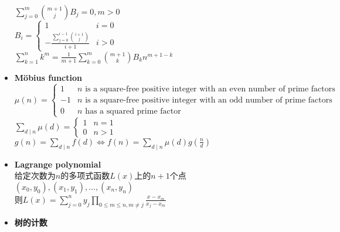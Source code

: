\begin{itemize}
			\\$ \sum\limits_{j = 0}^{m} \binom{m + 1}{j} B_j = 0, m > 0 $
			\\$ B_i = \begin{cases}
				1 & i = 0\\
				-\frac{\sum\limits_{j = 0}^{i - 1} \binom{i + 1}{j}}{i + 1} & i > 0
			\end{cases} $
			\\$ \sum\limits_{k = 1}^{n} k ^ m = \frac{1}{m + 1} \sum\limits_{k = 0}^{m} \binom{m + 1}{k} B_k n ^ {m + 1 - k} $
		\item \textbf{Möbius function}
			\\$ \mu(n) = \begin{cases}
				1 & n \text{ is a square-free positive integer with an even number of prime factors}\\
				-1 & n \text{ is a square-free positive integer with an odd number of prime factors}\\
				0 & n \text{ has a squared prime factor}
			\end{cases} $
			\\$ \sum\limits_{d \mid n} \mu(d) = \begin{cases}
				1 & n = 1\\
				0 & n > 1
			\end{cases} $
			\\$ g(n) = \sum\limits_{d \mid n} f(d) \Leftrightarrow f(n) = \sum\limits_{d \mid n} \mu(d) g(\frac{n}{d}) $
		\item \textbf{Lagrange polynomial}
			\\给定次数为$ n $的多项式函数$ L(x) $上的$ n + 1 $个点$ (x_0, y_0), (x_1, y_1), \dots, (x_n, y_n) $
			\\则$ L(x) = \sum\limits_{j = 0}^{n} y_j \prod\limits_{0 \leq m \leq n, m \ne j} \frac{x - x_m}{x_j - x_m} $
		\item \textbf{树的计数}
\end{itemize}
